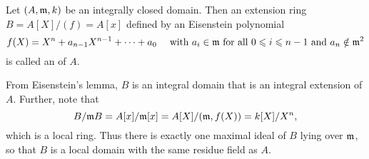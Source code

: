 \begin{definition}
    Let $(A,\mathfrak{m}, k)$ be an integrally closed domain. Then an extension ring $B = A[X]/(f) = A[x]$ defined by an Eisenstein polynomial 
    \begin{equation*}
        f(X) = X^n + a_{n - 1}X^{n - 1} + \dots + a_0\quad\text{ with }a_i\in\mathfrak{m}\text{ for all }0\leqslant i\leqslant n - 1\text{ and } a_n\notin\mathfrak{m}^2
    \end{equation*}
    is called an  of $A$.
\end{definition}

From Eisenstein's lemma, $B$ is an integral domain that is an integral extension of $A$. Further, note that 
\begin{equation*}
    B/\mathfrak{m} B = A[x]/\mathfrak{m}[x] = A[X]/(\mathfrak{m}, f(X)) = k[X]/X^n,
\end{equation*}
which is a local ring. Thus there is exactly one maximal ideal of $B$ lying over $\mathfrak{m}$, so that $B$ is a local domain with the same residue field as $A$.

